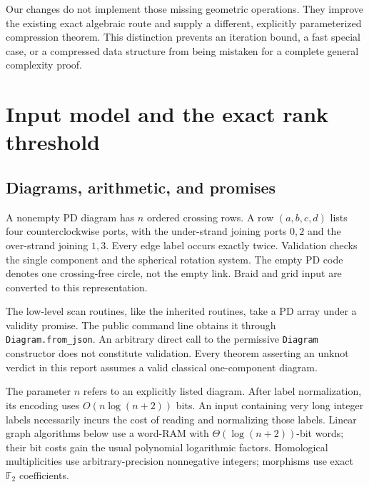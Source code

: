 \documentclass[11pt,letterpaper]{article}
\newcommand{\F}{\mathbb F_2}
\newcommand{\code}[1]{\texttt{#1}}
\begin{document}
Our changes do not implement those missing geometric operations. They improve
the existing exact algebraic route and supply a different, explicitly
parameterized compression theorem. This distinction prevents an iteration
bound, a fast special case, or a compressed data structure from being mistaken
for a complete general complexity proof.

\section{Input model and the exact rank threshold}
\label{sec:model}

\subsection{Diagrams, arithmetic, and promises}
A nonempty PD diagram has $n$ ordered crossing rows. A row
$(a,b,c,d)$ lists four counterclockwise ports, with the under-strand joining
ports $0,2$ and the over-strand joining $1,3$. Every edge label occurs exactly
twice. Validation checks the single component and the spherical rotation
system. The empty PD code denotes one crossing-free circle, not the empty
link. Braid and grid input are converted to this representation.

The low-level scan routines, like the inherited routines, take a PD array
under a validity promise. The public command line obtains it through
\code{Diagram.from\_json}. An arbitrary direct call to the permissive
\code{Diagram} constructor does not constitute validation. Every theorem
asserting an unknot verdict in this report assumes a valid classical
one-component diagram.

The parameter $n$ refers to an explicitly listed diagram. After label
normalization, its encoding uses $O(n\log(n+2))$ bits. An input containing
very long integer labels necessarily incurs the cost of reading and
normalizing those labels. Linear graph algorithms below use a word-RAM with
$\Theta(\log(n+2))$-bit words; their bit costs gain the usual polynomial
logarithmic factors. Homological multiplicities use arbitrary-precision
nonnegative integers; morphisms use exact $\F$ coefficients.
\end{document}
